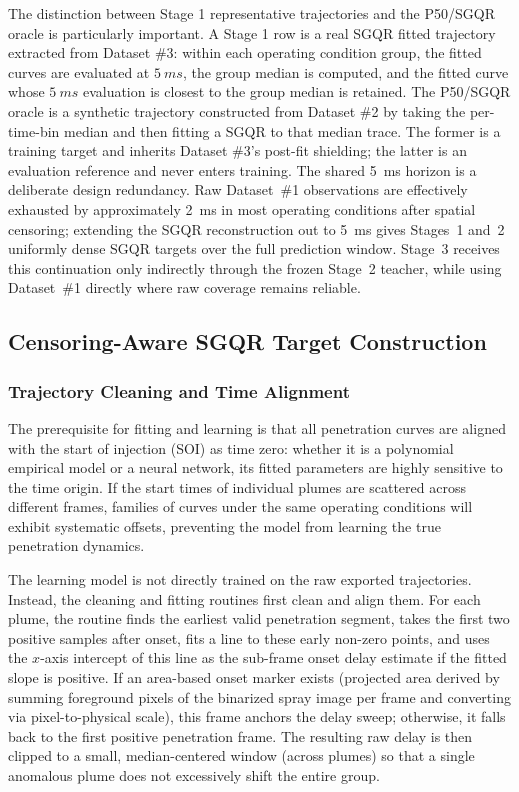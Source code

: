 The distinction between Stage 1 representative trajectories and the P50/SGQR oracle is particularly important. A Stage 1 row is a real SGQR fitted trajectory extracted from Dataset \#3: within each operating condition group, the fitted curves are evaluated at \(\SI{5}{ms}\), the group median is computed, and the fitted curve whose \(\SI{5}{ms}\) evaluation is closest to the group median is retained. The P50/SGQR oracle is a synthetic trajectory constructed from Dataset \#2 by taking the per-time-bin median and then fitting a SGQR to that median trace. The former is a training target and inherits Dataset \#3's post-fit shielding; the latter is an evaluation reference and never enters training.
The shared \SI{5}{ms} horizon is a deliberate design redundancy. Raw Dataset~\#1 observations are effectively exhausted by approximately \SI{2}{ms} in most operating conditions after spatial censoring; extending the SGQR reconstruction out to \SI{5}{ms} gives Stages~1 and~2 uniformly dense SGQR targets over the full prediction window. Stage~3 receives this continuation only indirectly through the frozen Stage~2 teacher, while using Dataset~\#1 directly where raw coverage remains reliable.

\subsection{Censoring-Aware SGQR Target Construction}
\label{sec:SGQR-target-construction-en}

\subsubsection{Trajectory Cleaning and Time Alignment}

The prerequisite for fitting and learning is that all penetration curves are aligned with the start of injection (SOI) as time zero: whether it is a polynomial empirical model or a neural network, its fitted parameters are highly sensitive to the time origin. If the start times of individual plumes are scattered across different frames, families of curves under the same operating conditions will exhibit systematic offsets, preventing the model from learning the true penetration dynamics.

The learning model is not directly trained on the raw exported trajectories. Instead, the cleaning and fitting routines first clean and align them. For each plume, the routine finds the earliest valid penetration segment, takes the first two positive samples after onset, fits a line to these early non-zero points, and uses the \(x\)-axis intercept of this line as the sub-frame onset delay estimate if the fitted slope is positive. If an area-based onset marker exists (projected area derived by summing foreground pixels of the binarized spray image per frame and converting via pixel-to-physical scale), this frame anchors the delay sweep; otherwise, it falls back to the first positive penetration frame. The resulting raw delay is then clipped to a small, median-centered window (across plumes) so that a single anomalous plume does not excessively shift the entire group.

